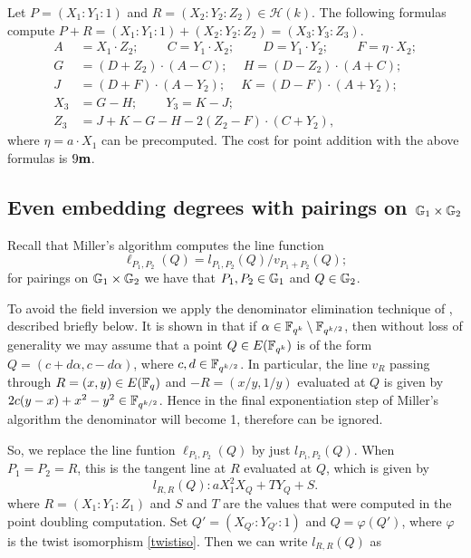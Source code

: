 Let $P = (X_1 : Y_1 : 1)$ and $R = (X_2 : Y_2 : Z_2) \in \mathcal{H}(k)$.
The following formulas compute
$P + R = (X_1 : Y_1 : 1) + (X_2 : Y_2 : Z_2) = (X_3 : Y_3 : Z_3)$.
\begin{align*}
A &= X_1 \cdot Z_2;\	\qquad
C = Y_1 \cdot X_2;\	\qquad
D = Y_1 \cdot Y_2;\	\qquad
F = \eta \cdot X_2;\\
G &= (D + Z_2) \cdot (A - C);\	\quad
H = (D - Z_2) \cdot (A + C);\\
J &= (D + F) \cdot (A - Y_2);\	\quad
K = (D - F) \cdot (A + Y_2);\\
X_3 &= G - H;\	\qquad
Y_3 = K - J;\\
Z_3 &= J + K - G - H - 2(Z_2 - F) \cdot (C + Y_2),
\end{align*}
where $\eta = a\cdot X_1$ can be precomputed.
The cost for point addition with the above formulas is $9\textbf{m}$.

\subsection{Even embedding degrees with pairings on $\mathbb{G}_{1} \times \mathbb{G}_{2}$}

Recall that Miller's algorithm computes the line function 
$$\ell_{P_1,P_2}(Q) = l_{P_1,P_2}(Q)/v_{P_1 + P_2}(Q);$$
for pairings on $\mathbb{G}_{1} \times \mathbb{G}_{2}$ we have that $P_1, P_2 \in \mathbb{G}_{1}$ and $Q \in \mathbb{G}_{2}$.

To avoid the field inversion we apply the denominator elimination technique of \cite{2010/Gu},
described briefly below. 
It is shown in \cite[Section 4]{2010/Gu} that if
$\alpha \in \mathbb{F}_{q^k} \setminus \mathbb{F}_{q^{k/2}}$, then
without loss of generality we may assume that a point
$Q \in E(\mathbb{F}_{q^k})$ is of the form
$Q = (c+d\alpha, c-d\alpha )$, where
$c, d \in \mathbb{F}_{q^{k/2}}$.
In particular, the line $v_R$ passing through $R = (x,y) \in E(\mathbb{F}_{q})$ 
and $-R = (x/y, 1/y)$ evaluated at $Q$ is given by
$2c(y-x) + x^2-y^2 \in \mathbb{F}_{q^{k/2}}$.
Hence in the final exponentiation step of Miller's algorithm the denominator will become 1,
therefore can be ignored.

So, we replace the line funtion $\ell_{P_1,P_2}(Q)$ by just $l_{P_1,P_2}(Q)$.
When $P_1 = P_2 = R$, this is the tangent line at $R$ evaluated at $Q$, which is given by
\[l_{R,R}(Q): aX_1^2 X_Q + T Y_Q + S.\]
where $R = (X_1:Y_1:Z_1)$ 
and $S$ and $T$ are the values that were computed in the point doubling computation.
Set $Q' = (X_{Q'}:Y_{Q'}:1)$ and $Q = \varphi(Q')$, where
$\varphi$ is the twist isomorphism \eqref{twistiso}.
Then we can write $l_{R,R}(Q)$ as


